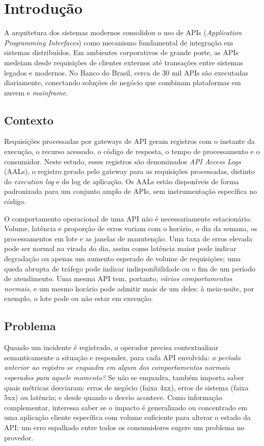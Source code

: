 \documentclass[sigconf,nonacm]{acmart}
\begin{document}
\maketitle

\section{Introdução}

A arquitetura dos sistemas modernos consolidou o uso de APIs (\emph{Application Programming Interfaces}) como mecanismo fundamental de integração em sistemas distribuídos. Em ambientes corporativos de grande porte, as APIs medeiam desde requisições de clientes externos até transações entre sistemas legados e modernos. No Banco do Brasil, cerca de 30 mil APIs são executadas diariamente, conectando soluções de negócio que combinam plataformas em nuvem e \emph{mainframe}.

\subsection{Contexto}

Requisições processadas por gateways de API geram registros com o instante da execução, o recurso acessado, o código de resposta, o tempo de processamento e o consumidor. Neste estudo, esses registros são denominados \emph{API Access Logs} (AALs), o registro gerado pelo gateway para as requisições processadas, distinto do \emph{execution log} e do log de aplicação. Os AALs estão disponíveis de forma padronizada para um conjunto amplo de APIs, sem instrumentação específica no código.

O comportamento operacional de uma API não é necessariamente estacionário. Volume, latência e proporção de erros variam com o horário, o dia da semana, os processamentos em lote e as janelas de manutenção. Uma taxa de erros elevada pode ser normal na virada do dia, assim como latência maior pode indicar degradação ou apenas um aumento esperado de volume de requisições; uma queda abrupta de tráfego pode indicar indisponibilidade ou o fim de um período de atendimento. Uma mesma API tem, portanto, \emph{vários comportamentos normais}, e um mesmo horário pode admitir mais de um deles: à meia-noite, por exemplo, o lote pode ou não estar em execução.

\subsection{Problema}
Quando um incidente é registrado, o operador precisa contextualizar semanticamente a situação e responder, para cada API envolvida: \emph{o período anterior ao registro se enquadra em algum dos comportamentos normais esperados para aquele momento?} Se não se enquadra, também importa saber quais métricas desviaram: erros de negócio (faixa 4xx), erros de sistema (faixa 5xx) ou latência; e desde quando o desvio acontece. Como informação complementar, interessa saber se o impacto é generalizado ou concentrado em uma aplicação cliente específica com volume suficiente para alterar o estado da API; um erro espalhado entre todos os consumidores sugere um problema no provedor.
\end{document}
